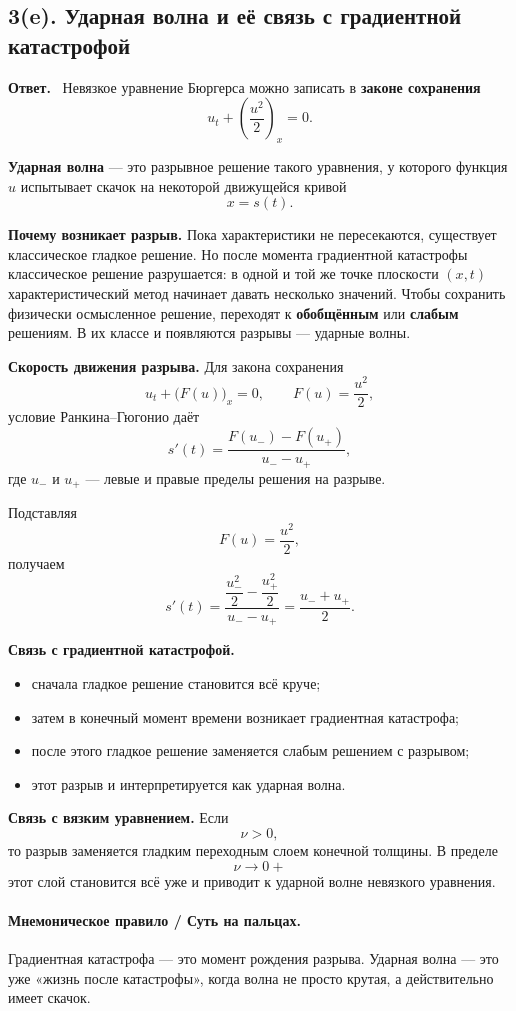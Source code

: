 \documentclass[a4paper,12pt]{article}
\newcommand{\Answer}{\textbf{Ответ.}\ }
\begin{document}
\subsection*{3(e). Ударная волна и её связь с градиентной катастрофой}

\Answer
Невязкое уравнение Бюргерса можно записать в \textbf{законе сохранения}
\[
u_t+\left(\frac{u^2}{2}\right)_x=0.
\]

\textbf{Ударная волна} --- это разрывное решение такого уравнения, у которого функция $u$ испытывает скачок на некоторой движущейся кривой
\[
x=s(t).
\]

\textbf{Почему возникает разрыв.}
Пока характеристики не пересекаются, существует классическое гладкое решение. Но после момента градиентной катастрофы классическое решение разрушается: в одной и той же точке плоскости $(x,t)$ характеристический метод начинает давать несколько значений. Чтобы сохранить физически осмысленное решение, переходят к \textbf{обобщённым} или \textbf{слабым} решениям. В их классе и появляются разрывы --- ударные волны.

\textbf{Скорость движения разрыва.}
Для закона сохранения
\[
u_t+\bigl(F(u)\bigr)_x=0,
\qquad
F(u)=\frac{u^2}{2},
\]
условие Ранкина--Гюгонио даёт
\[
s'(t)=\frac{F(u_-)-F(u_+)}{u_--u_+},
\]
где $u_-$ и $u_+$ --- левые и правые пределы решения на разрыве.

Подставляя
\[
F(u)=\frac{u^2}{2},
\]
получаем
\[
s'(t)=\frac{\dfrac{u_-^2}{2}-\dfrac{u_+^2}{2}}{u_--u_+}
=
\frac{u_-+u_+}{2}.
\]

\textbf{Связь с градиентной катастрофой.}
\begin{itemize}
  \item сначала гладкое решение становится всё круче;
  \item затем в конечный момент времени возникает градиентная катастрофа;
  \item после этого гладкое решение заменяется слабым решением с разрывом;
  \item этот разрыв и интерпретируется как ударная волна.
\end{itemize}

\textbf{Связь с вязким уравнением.}
Если
\[
\nu>0,
\]
то разрыв заменяется гладким переходным слоем конечной толщины. В пределе
\[
\nu\to 0+
\]
этот слой становится всё уже и приводит к ударной волне невязкого уравнения.

\paragraph{Мнемоническое правило / Суть на пальцах.}
Градиентная катастрофа --- это момент рождения разрыва. Ударная волна --- это уже «жизнь после катастрофы», когда волна не просто крутая, а действительно имеет скачок.
\end{document}
